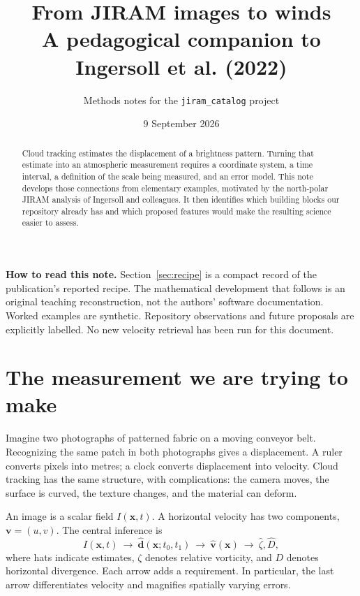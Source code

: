\documentclass[11pt]{article}
\title{\color{ink}From JIRAM images to winds\\[0.35em]
 \large A pedagogical companion to Ingersoll et al. (2022)}
\author{Methods notes for the \texttt{jiram\_catalog} project}
\date{9 September 2026}
\newcommand{\vel}{\bm{v}}
\newcommand{\pos}{\bm{x}}
\newcommand{\disp}{\bm{d}}
\begin{document}
\maketitle
\begin{abstract}
Cloud tracking estimates the displacement of a brightness pattern. Turning
that estimate into an atmospheric measurement requires a coordinate system,
a time interval, a definition of the scale being measured, and an error model.
This note develops those connections from elementary examples, motivated by
the north-polar JIRAM analysis of Ingersoll and colleagues. It then identifies
which building blocks our repository already has and which proposed features
would make the resulting science easier to assess.
\end{abstract}

\textbf{How to read this note.} Section~\ref{sec:recipe} is a compact record
of the publication's reported recipe. The mathematical development that
follows is an original teaching reconstruction, not the authors' software
documentation. Worked examples are synthetic. Repository observations and
future proposals are explicitly labelled. No new velocity retrieval has been
run for this document.

\tableofcontents
\newpage

\section{The measurement we are trying to make}

Imagine two photographs of patterned fabric on a moving conveyor belt.
Recognizing the same patch in both photographs gives a displacement. A ruler
converts pixels into metres; a clock converts displacement into velocity.
Cloud tracking has the same structure, with complications: the camera moves,
the surface is curved, the texture changes, and the material can deform.

An image is a scalar field $I(\pos,t)$. A horizontal velocity has two
components, $\vel=(u,v)$. The central inference is
\begin{equation}
 I(\pos,t)\ \longrightarrow\ \widehat{\disp}(\pos;t_0,t_1)
 \ \longrightarrow\ \widehat{\vel}(\pos)
 \ \longrightarrow\ \widehat{\zeta},\widehat{D},
\end{equation}
where hats indicate estimates, $\zeta$ denotes relative vorticity, and $D$
denotes horizontal divergence. Each arrow adds a requirement. In particular,
the last arrow differentiates velocity and magnifies spatially varying errors.
\end{document}
